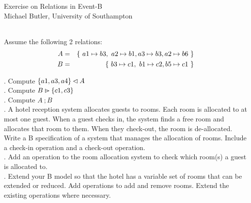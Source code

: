 \documentclass{article}
\begin{document}
\begin{centering}
Exercise on Relations in Event-B \\
Michael Butler, University of Southampton \\[1ex] ~\\
\end{centering}



\noindent  Assume the following 2 relations:
\begin{eqnarray*}
    A &=& \{~ a1\mapsto b3,~ a2\mapsto b1, a3\mapsto b3,
    a2\mapsto b6 ~\} \\
    B &=&  \{~ b3\mapsto c1,~ b1\mapsto c2, b5\mapsto c1 ~\}
\end{eqnarray*}

.  Compute $\{a1,a3,a4\}\mathbin\lhd A$ \\

.  Compute $B\mathbin{\rhd\mkern-14mu-} \{c1,c3\}$ \\

.  Compute $A~;B$ \\

. A hotel reception system allocates guests to rooms.
Each room is allocated to at most one guest.  When a guest checks
in, the system finds a  free room and allocates that room to them.
When they check-out, the room is de-allocated. Write a B
specification of a system that manages the allocation of rooms.
Include a
check-in operation and a check-out operation. \\

. Add an operation to the room allocation system to
check which room(s) a guest is allocated to. \\


. Extend your B model so that the hotel has a variable
set of rooms that can be extended or reduced.  Add operations to
add and remove rooms.  Extend the existing operations where
necessary.
\end{document}
